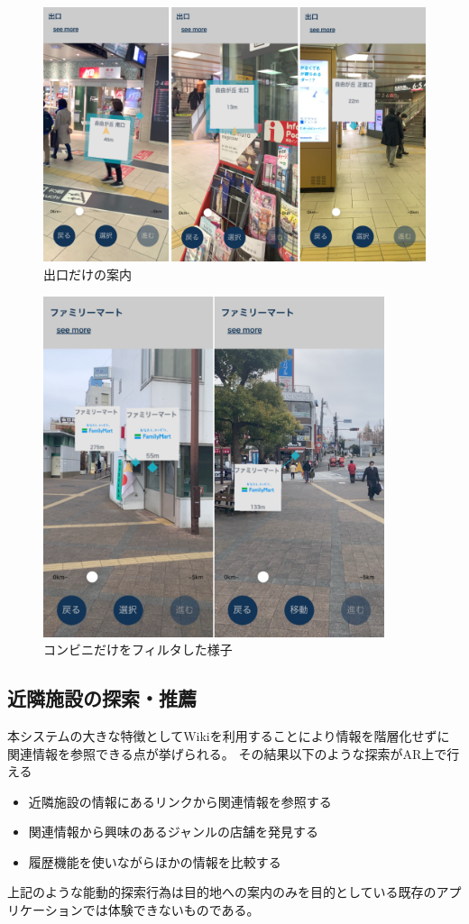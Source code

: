 \begin{figure}[H]
  \centering
  \includegraphics[width=120mm]{images/ar_navigation_exit.png}
  \caption{出口だけの案内} \label{fig:ar_navigation_exit}
\end{figure}

\begin{figure}[H]
  \centering
  \includegraphics[height=100mm]{images/ar_filter_famima.png}
  \caption{コンビニだけをフィルタした様子} \label{fig:ar_navigation_ad}
\end{figure}

\subsection{近隣施設の探索・推薦}

本システムの大きな特徴としてWikiを利用することにより情報を階層化せずに関連情報を参照できる点が挙げられる。
その結果以下のような探索がAR上で行える
\begin{itemize}
  \item 近隣施設の情報にあるリンクから関連情報を参照する
  \item 関連情報から興味のあるジャンルの店舗を発見する
  \item 履歴機能を使いながらほかの情報を比較する
\end{itemize}
上記のような能動的探索行為は目的地への案内のみを目的としている既存のアプリケーションでは体験できないものである。


